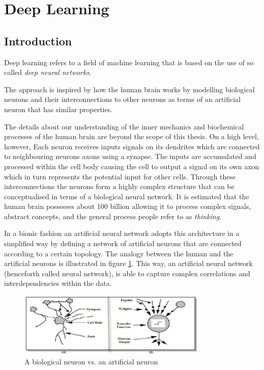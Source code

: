\section{Deep Learning}
\subsection{Introduction}
Deep learning refers to a field of machine learning that is based on the use of so called \emph{deep neural networks}. 

The approach is inspired by how the human brain works by modelling biological neurons and their interconnections to other neurons as terms of an artificial neuron that has similar properties. 

The details about our understanding of the inner mechanics and biochemical processes of the human brain are beyond the scope of this thesis. On a high level, however, Each neuron receives inputs signals on its dendrites which are connected to neighbouring neurons axons using a synapse. The inputs are accumulated and processed within the cell body causing the cell to output a signal on its own axon which in turn represents the potential input for other cells.
Through these interconnections the neurons form a highly complex structure that can be conceptualised in terms of a biological neural network. It is estimated that the human brain possesses about 100 billion allowing it to process complex signals, abstract concepts, and the general process people refer to as \emph{thinking}. 

In a bionic fashion an artificial neural network adopts this architecture in a simplified way by defining a network of artificial neurons that are connected according to a certain topology. The analogy between the human and the artificial neurons is illustrated in figure \ref{fig:biological-vs-artificial-neuron}. 
This way, an artificial neural network (henceforth called neural network), is able to capture complex correlations and interdependencies within the data. 

\begin{figure}[h]
	\caption{A biological neuron vs. an artificial neuron}\label{fig:biological-vs-artificial-neuron}
	\centering
	\includegraphics[width=0.8\textwidth]{figures/chapter-2/biological-vs-artificial-neurons.png}
\end{figure}


